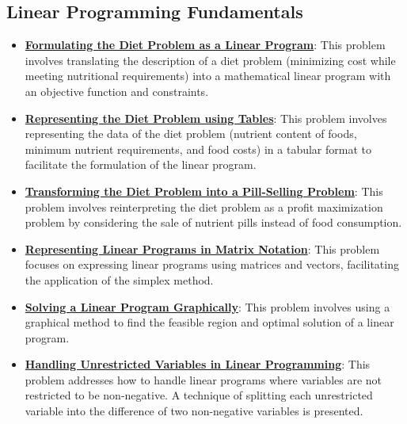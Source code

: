 \documentclass{article}%
\begin{document}
\subsection{Linear Programming Fundamentals}%
\label{subsec:LinearProgrammingFundamentals}%
\begin{itemize}[leftmargin=*]%
\item \href{https://www.math.purdue.edu/~yipn/421/2024-09-19-DualityExamples.pdf#page=5}{\textbf{Formulating the Diet Problem as a Linear Program}}: This problem involves translating the description of a diet problem (minimizing cost while meeting nutritional requirements) into a mathematical linear program with an objective function and constraints.%
\item \href{https://www.math.purdue.edu/~yipn/421/2024-09-19-DualityExamples.pdf#page=3}{\textbf{Representing the Diet Problem using Tables}}: This problem involves representing the data of the diet problem (nutrient content of foods, minimum nutrient requirements, and food costs) in a tabular format to facilitate the formulation of the linear program.%
\item \href{https://www.math.purdue.edu/~yipn/421/2024-09-19-DualityExamples.pdf#page=7}{\textbf{Transforming the Diet Problem into a Pill-Selling Problem}}: This problem involves reinterpreting the diet problem as a profit maximization problem by considering the sale of nutrient pills instead of food consumption.%
\item \href{https://www.math.purdue.edu/~yipn/421/2024-09-24-SimplexMatrix.pdf#page=1}{\textbf{Representing Linear Programs in Matrix Notation}}: This problem focuses on expressing linear programs using matrices and vectors, facilitating the application of the simplex method.%
\item \href{https://www.math.purdue.edu/~yipn/421/2024-09-24-SimplexMatrix.pdf#page=21}{\textbf{Solving a Linear Program Graphically}}: This problem involves using a graphical method to find the feasible region and optimal solution of a linear program.%
\item \href{https://www.math.purdue.edu/~yipn/421/2024-10-01-DualGeneralLP.pdf#page=2}{\textbf{Handling Unrestricted Variables in Linear Programming}}: This problem addresses how to handle linear programs where variables are not restricted to be non-negative. A technique of splitting each unrestricted variable into the difference of two non-negative variables is presented.%
\end{itemize}

%
\end{document}

